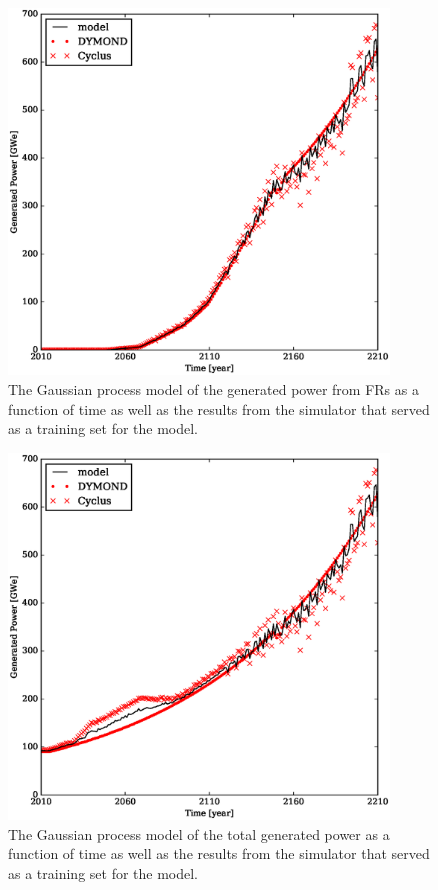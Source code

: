 \begin{figure}[htb]
\centering
\includegraphics[width=0.9\textwidth]{gwe-model-fr.eps}
\caption{The Gaussian process model of the generated power from FRs
as a function of time as well as the results from the simulator that served as a 
training set for the model.}
\label{gwe-model-fr}
\end{figure}

\begin{figure}[htb]
\centering
\includegraphics[width=0.9\textwidth]{gwe-model-total.eps}
\caption{The Gaussian process model of the total generated power
as a function of time as well as the results from the simulator that served as a 
training set for the model.}
\label{gwe-model-total}
\end{figure}

